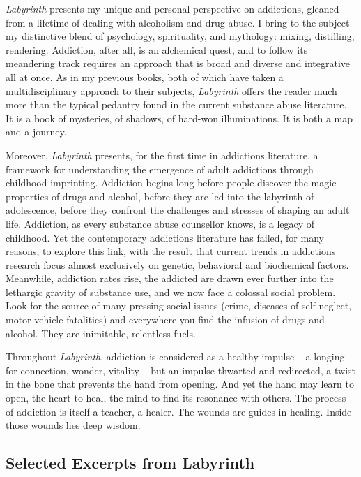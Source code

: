 \documentclass[10pt,DIV09,letterpaper,oneside,headsepline]{scrreprt}
\begin{document}
\textit{Labyrinth} presents my unique and personal perspective on addictions, gleaned from a lifetime of dealing with alcoholism and drug abuse. I bring to the subject my distinctive blend of psychology, spirituality, and mythology: mixing, distilling, rendering. Addiction, after all, is an alchemical quest, and to follow its meandering track requires an approach that is broad and diverse and integrative all at once. As in my previous books, both of which have taken a multidisciplinary approach to their subjects, \textit{Labyrinth} offers the reader much more than the typical pedantry found in the current substance abuse literature. It is a book of mysteries, of shadows, of hard-won illuminations. It is both a map and a journey.

Moreover, \textit{ Labyrinth} presents, for the first time in addictions literature, a framework for understanding the emergence of adult addictions through childhood imprinting. Addiction begins long before people discover the magic properties of drugs and alcohol, before they are led into the labyrinth of adolescence, before they confront the challenges and stresses of shaping an adult life. Addiction, as every substance abuse counsellor knows, is a legacy of childhood. Yet the contemporary addictions literature has failed, for many reasons, to explore this link, with the result that current trends in addictions research focus almost exclusively on genetic, behavioral and biochemical factors. Meanwhile, addiction rates rise, the addicted are drawn ever further into the lethargic gravity of substance use, and we now face a colossal social problem. Look for the source of many pressing social issues (crime, diseases of self-neglect, motor vehicle fatalities) and everywhere you find the infusion of drugs and alcohol. They are inimitable, relentless fuels.

Throughout \textit{Labyrinth}, addiction is considered as a healthy impulse -- a longing for connection, wonder, vitality -- but an impulse thwarted and redirected, a twist in the bone that prevents the hand from opening. And yet the hand may learn to open, the heart to heal, the mind to find its resonance with others. The process of addiction is itself a teacher, a healer. The wounds are guides in healing. Inside those wounds lies deep wisdom.

\subsection{Selected Excerpts from Labyrinth}
\end{document}
